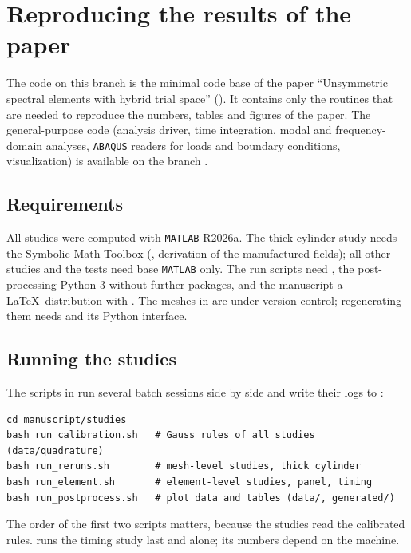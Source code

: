 \chapter{Reproducing the results of the paper}
\label{ch:reproducing}

The code on this branch is the minimal code base of the paper \enquote{Unsymmetric
spectral elements with hybrid trial space} (). It contains only
the routines that are needed to reproduce the numbers, tables and figures of the
paper. The general-purpose code (analysis driver, time integration, modal and
frequency-domain analyses, \texttt{ABAQUS} readers for loads and boundary conditions,
visualization) is available on the branch .

\section{Requirements}

All studies were computed with \texttt{MATLAB} R2026a. The thick-cylinder study
needs the Symbolic Math Toolbox (, derivation of the manufactured
fields); all other studies and the tests need base \texttt{MATLAB} only. The run
scripts need , the post-processing Python 3 without further packages, and
the manuscript a \LaTeX\ distribution with . The meshes in
 are under version control; regenerating them needs
 and its Python interface.

\section{Running the studies}

The scripts in  run several batch sessions side by side and
write their logs to :
\begin{lstlisting}[style=shell]
cd manuscript/studies
bash run_calibration.sh   # Gauss rules of all studies (data/quadrature)
bash run_reruns.sh        # mesh-level studies, thick cylinder
bash run_element.sh       # element-level studies, panel, timing
bash run_postprocess.sh   # plot data and tables (data/, generated/)
\end{lstlisting}
The order of the first two scripts matters, because the studies read the calibrated
rules.  runs the timing study last and alone; its numbers
depend on the machine.

